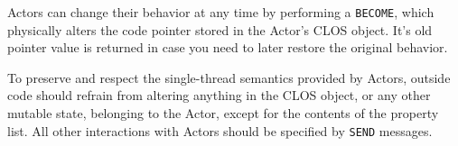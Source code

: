 \documentclass[article,oneside]{memoir}
\begin{document}
Actors can change their behavior at any time by performing a \texttt{BECOME}, which physically alters the code pointer stored in the Actor's CLOS object. It's old pointer value is returned in case you need to later restore the original behavior. 

To preserve and respect the single-thread semantics provided by Actors, outside code should refrain from altering anything in the CLOS object, or any other mutable state, belonging to the Actor, except for the contents of the property list. All other interactions with Actors should be specified by \texttt{SEND} messages.
\end{document}
